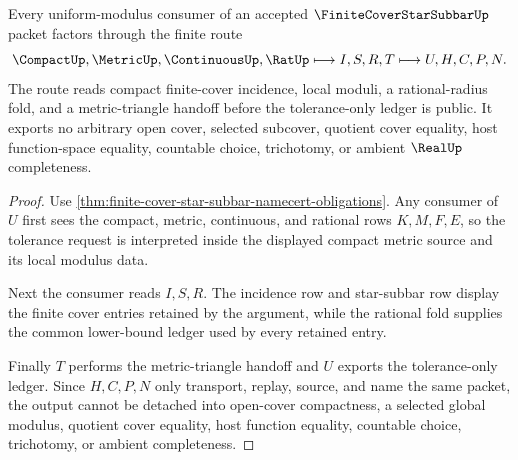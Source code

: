 \begin{theorem}\label{thm:finite-cover-star-subbar-uniform-modulus-route}
Every uniform-modulus consumer of an accepted $\FiniteCoverStarSubbarUp$ packet factors through the finite route
$$
\CompactUp,\MetricUp,\ContinuousUp,\RatUp
\longmapsto
I,S,R,T
\longmapsto
U,H,C,P,N .
$$
The route reads compact finite-cover incidence, local moduli, a rational-radius fold, and a metric-triangle handoff before the tolerance-only ledger is public. It exports no arbitrary open cover, selected subcover, quotient cover equality, host function-space equality, countable choice, trichotomy, or ambient $\RealUp$ completeness.
\end{theorem}
\begin{proof}
Use \autoref{thm:finite-cover-star-subbar-namecert-obligations}. Any consumer of $U$ first sees the compact, metric, continuous, and rational rows $K,M,F,E$, so the tolerance request is interpreted inside the displayed compact metric source and its local modulus data.

Next the consumer reads $I,S,R$. The incidence row and star-subbar row display the finite cover entries retained by the argument, while the rational fold supplies the common lower-bound ledger used by every retained entry.

Finally $T$ performs the metric-triangle handoff and $U$ exports the tolerance-only ledger. Since $H,C,P,N$ only transport, replay, source, and name the same packet, the output cannot be detached into open-cover compactness, a selected global modulus, quotient cover equality, host function equality, countable choice, trichotomy, or ambient completeness.
\end{proof}



